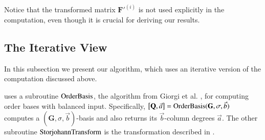 Notice that the transformed matrix $\mathbf{F}'^{\left(i\right)}$
is not used explicitly in the computation, even though it is crucial
for deriving our results.


\subsection{The Iterative View}

In this subsection we present our algorithm, which uses an iterative
version of the computation discussed above.%
\begin{comment}
The recursive top-down approach of the previous subsection is useful
for giving an overall picture of the computation process. Algorithm
\prettyref{alg:mab} uses an equivalent corresponding bottom-up iterative
approach. 
\end{comment}
{}%
\begin{comment}
, allowing the complexity to be more easily analyzed. 
\end{comment}
{}%
\begin{comment}
. In practice, bottom-up iterative approaches are more efficient than
the corresponding top-down recursive approaches. For our purpose,
it is also easier to analyze the computational cost of the iterative
procedure. 
\end{comment}
{}

 uses a subroutine $\mab$, the algorithm from
Giorgi et al. \citeyearpar{Giorgi2003}, for computing order bases
with balanced input. Specifically, $\left[\mathbf{Q},\vec{a}\right]=\mab(\mathbf{G},\sigma,\vec{b})$
computes a $(\mathbf{G},\sigma,\vec{b})$-basis and also returns its
$\vec{b}$-column degrees $\vec{a}$. The other subroutine $\StorjohannTransform$
is the transformation described in .

